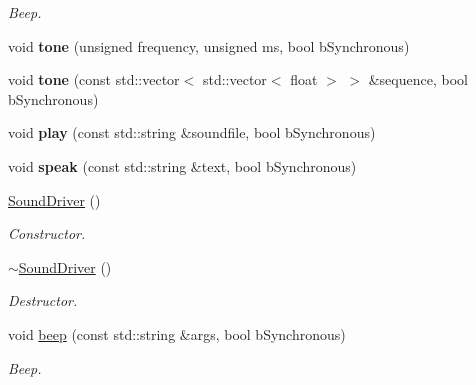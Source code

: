 \begin{DoxyCompactItemize}
\begin{DoxyCompactList}\small\item\em Beep. \end{DoxyCompactList}\item 
\mbox{\label{classSoundDriver_a73ac421559404c201308915ad9e4f8e0}} 
void {\bfseries tone} (unsigned frequency, unsigned ms, bool b\+Synchronous)
\item 
\mbox{\label{classSoundDriver_a39ea1b35ab6091e79663fa489cdcff25}} 
void {\bfseries tone} (const std\+::vector$<$ std\+::vector$<$ float $>$ $>$ \&sequence, bool b\+Synchronous)
\item 
\mbox{\label{classSoundDriver_afd64ca3d517d01947d514eb689027eea}} 
void {\bfseries play} (const std\+::string \&soundfile, bool b\+Synchronous)
\item 
\mbox{\label{classSoundDriver_a44869623a4c7ad03e9a65388647bc10c}} 
void {\bfseries speak} (const std\+::string \&text, bool b\+Synchronous)
\item 
\mbox{\label{classSoundDriver_aa45970b1e9155eb51a155cc7ef4389dc}} 
\hyperlink{classSoundDriver_aa45970b1e9155eb51a155cc7ef4389dc}{Sound\+Driver} ()
\begin{DoxyCompactList}\small\item\em Constructor. \end{DoxyCompactList}\item 
\mbox{\label{classSoundDriver_a45845cb8587a626a4ab6a2c53dcdf7c0}} 
\hyperlink{classSoundDriver_a45845cb8587a626a4ab6a2c53dcdf7c0}{$\sim$\+Sound\+Driver} ()
\begin{DoxyCompactList}\small\item\em Destructor. \end{DoxyCompactList}\item 
\mbox{\label{classSoundDriver_a33bbfa860cd88f113d1fbf4bf68708ba}} 
void \hyperlink{classSoundDriver_a33bbfa860cd88f113d1fbf4bf68708ba}{beep} (const std\+::string \&args, bool b\+Synchronous)
\begin{DoxyCompactList}\small\item\em Beep. \end{DoxyCompactList}\item 

\end{DoxyCompactItemize}
